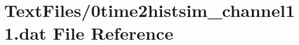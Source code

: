 \hypertarget{0time2histsim__channel11_8dat}{}\section{Text\+Files/0time2histsim\+\_\+channel11.dat File Reference}
\label{0time2histsim__channel11_8dat}
